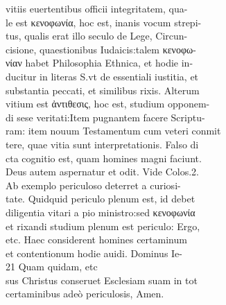 \documentclass{article}
\begin{document}
\begin{pages}
                vitiis euertentibus officii integritatem, qua- \\
                le est κενοφωνία, hoc est, inanis vocum strepi- \\
                tus, qualis erat illo seculo de Lege, Circun- \\
                cisione, quaestionibus Iudaicis:talem κενοφω- \\
                νίαν habet Philosophia Ethnica, et hodie in- \\
                ducitur in literas S.vt de essentiali iustitia, et \\
                substantia peccati, et similibus rixis. Alterum \\
                vitium est ἀντιθεσις, hoc est, studium opponem- \\
                di sese veritati:Item pugnantem facere Scriptu- \\
                ram: item nouum Testamentum cum veteri conmit \\
                tere, quae vitia sunt interpretationis. Falso di \\
                cta cognitio est, quam homines magni faciunt. \\
                Deus autem aspernatur et odit. Vide Colos.2. \\
                Ab exemplo periculoso deterret a curiosi- \\
                tate. Quidquid periculo plenum est, id debet \\
                diligentia vitari a pio ministro:sed κενοφωνία \\
                et rixandi studium plenum est periculo: Ergo, \\
                etc. Haec considerent homines certaminum \\
                et contentionum hodie auidi. Dominus Ie- \\
                21 Quam quidam, etc \\
                sus Christus conseruet Esclesiam suam in tot \\
                certaminibus adeò periculosis, Amen. \\
                
\end{pages}
\end{document}
